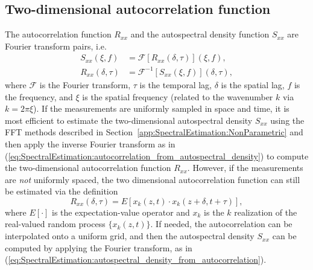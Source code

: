\subsection{Two-dimensional autocorrelation function}
\label{app:SpectralEstimation:2d_spectra:correlation_function}
The autocorrelation function $R_{xx}$ and
the autospectral density function $S_{xx}$
are Fourier transform pairs, i.e.\
\begin{align}
  S_{xx}(\xi, f)
  &=
  \mathcal{F}[R_{xx}(\delta, \tau)](\xi, f),
  \label{eq:SpectralEstimation:autospectral_density_from_autocorrelation}
  \\
  R_{xx}(\delta, \tau)
  &=
  \mathcal{F}^{-1}[S_{xx}(\xi, f)](\delta, \tau),
  \label{eq:SpectralEstimation:autocorrelation_from_autospectral_density}
\end{align}
where
$\mathcal{F}$ is the Fourier transform,
$\tau$ is the temporal lag,
$\delta$ is the spatial lag,
$f$ is the frequency, and
$\xi$ is the spatial frequency
(related to the wavenumber $k$ via $k = 2 \pi \xi$).
If the measurements are uniformly sampled in space and time,
it is most efficient to estimate
the two-dimensional autospectral density $S_{xx}$
using the FFT methods described in
Section~\ref{app:SpectralEstimation:NonParametric} and
then apply the inverse Fourier transform
as in (\ref{eq:SpectralEstimation:autocorrelation_from_autospectral_density})
to compute the two-dimensional autocorrelation function $R_{xx}$.
However, if the measurements are \emph{not} uniformly spaced,
the two dimensional autocorrelation function
can still be estimated via the definition
\begin{equation}
  R_{xx}(\delta, \tau)
  =
  E[x_k(z, t) \cdot x_k(z + \delta, t + \tau)],
  \label{eq:SpectralEstimation:autocorrelation_definition}
\end{equation}
where $E[\cdot]$ is the expectation-value operator and
$x_k$ is the $k$ realization
of the real-valued random process $\{x_k(z, t)\}$.
If needed, the autocorrelation can be interpolated onto a uniform grid, and
then the autospectral density $S_{xx}$ can be computed
by applying the Fourier transform,
as in (\ref{eq:SpectralEstimation:autospectral_density_from_autocorrelation}).

